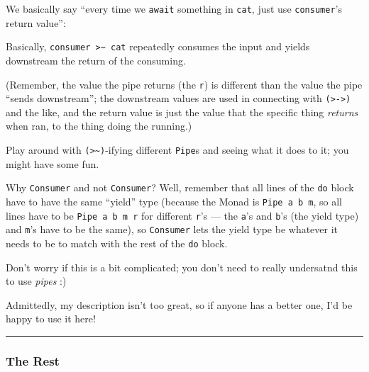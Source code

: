 \documentclass[]{article}
\newenvironment{Shaded}{}{}
\newcommand{\KeywordTok}[1]{\textcolor[rgb]{0.00,0.44,0.13}{\textbf{{#1}}}}
\newcommand{\OtherTok}[1]{\textcolor[rgb]{0.00,0.44,0.13}{{#1}}}
\newcommand{\FunctionTok}[1]{\textcolor[rgb]{0.02,0.16,0.49}{{#1}}}
\newcommand{\NormalTok}[1]{{#1}}
\begin{document}
We basically say ``every time we \texttt{await} something in
\texttt{cat}, just use \texttt{consumer}'s return value'':

\begin{Shaded}
\end{Shaded}

Basically, \texttt{consumer\ \textgreater{}\textasciitilde{}\ cat}
repeatedly consumes the input and yields downstream the return of the
consuming.

(Remember, the value the pipe returns (the \texttt{r}) is different than
the value the pipe ``sends downstream''; the downstream values are used
in connecting with \texttt{(\textgreater{}-\textgreater{})} and the
like, and the return value is just the value that the specific thing
\emph{returns} when ran, to the thing doing the running.)

Play around with \texttt{(\textgreater{}\textasciitilde{})}-ifying
different \texttt{Pipe}s and seeing what it does to it; you might have
some fun.

Why \texttt{Consumer\textquotesingle{}} and not \texttt{Consumer}? Well,
remember that all lines of the \texttt{do} block have to have the same
``yield'' type (because the Monad is \texttt{Pipe\ a\ b\ m}, so all
lines have to be \texttt{Pipe\ a\ b\ m\ r} for different \texttt{r}'s
--- the \texttt{a}'s and \texttt{b}'s (the yield type) and \texttt{m}'s
have to be the same), so \texttt{Consumer\textquotesingle{}} lets the
yield type be whatever it needs to be to match with the rest of the
\texttt{do} block.

Don't worry if this is a bit complicated; you don't need to really
undersatnd this to use \emph{pipes} :)

Admittedly, my description isn't too great, so if anyone has a better
one, I'd be happy to use it here!

\begin{center}\rule{0.5\linewidth}{\linethickness}\end{center}

\subsubsection{The Rest}\label{the-rest}
\end{document}
